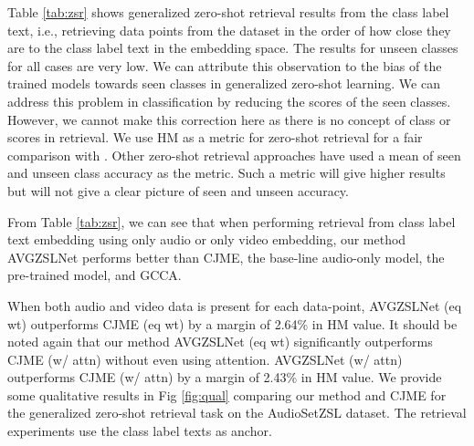 \documentclass[10pt,twocolumn,letterpaper]{article}
\begin{document}
 Table \ref{tab:zsr} shows generalized zero-shot retrieval results from the class label text, i.e., retrieving data points from the dataset in the order of how close they are to the class label text in the embedding space. The results for unseen classes for all cases are very low. We can attribute this observation to the bias of the trained models towards seen classes in generalized zero-shot learning. We can address this problem in classification by reducing the scores of the seen classes. However, we cannot make this correction here as there is no concept of class or scores in retrieval. We use HM as a metric for zero-shot retrieval for a fair comparison with \cite{parida2020coordinated}. Other zero-shot retrieval approaches have used a mean of seen and unseen class accuracy as the metric. Such a metric will give higher results but will not give a clear picture of seen and unseen accuracy.

From Table \ref{tab:zsr}, we can see that when performing retrieval from class label text embedding using only audio or only video embedding, our method AVGZSLNet performs better than CJME, the base-line audio-only model, the pre-trained model, and GCCA. 

When both audio and video data is present for each data-point, AVGZSLNet (eq wt) outperforms CJME (eq wt) by a margin of 2.64\% in HM value. It should be noted again that our method AVGZSLNet (eq wt) significantly outperforms CJME (w/ attn) without even using attention.  AVGZSLNet (w/ attn) outperforms CJME (w/ attn) by a margin of 2.43\% in HM value. We provide some qualitative results in Fig \ref{fig:qual} comparing our method and CJME for the generalized zero-shot retrieval task on the AudioSetZSL dataset. The retrieval experiments use the class label texts as anchor.
 
 \begin{table}[t]
 \centering
{}
 \caption{Ablation study to verify the contribution of ,  and  components of  on AVGZSLNet (eq wt) for generalized zero-shot classification (\% mAcc).}
 \label{tab:ablcmd}
\vspace{-15pt}
 \end{table}
 
\end{document}
